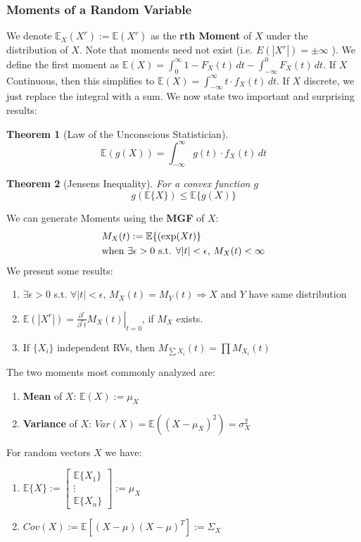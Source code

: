 \documentclass[]{article}
\theoremstyle{mattstyle}
\newtheorem{theorem}{Theorem}[section]
\theoremstyle{definition}
\begin{document}
\subsubsection{Moments of a Random Variable}
We denote \(\mathbb{E}_X(X^r) := \mathbb{E}(X^r)\) as the \textbf{rth Moment} of \(X\) under the distribution of \(X\). Note that moments need not exist (i.e. \(E(|X^r|)=\pm\infty\) ). We define the first moment as \(\mathbb{E}(X) = \int_0^\infty 1 - F_X(t)\,dt - \int_{-\infty}^0 F_X(t)\,dt\). If \(X\) Continuous, then this simplifies to \(\mathbb{E}(X) = \int_{-\infty}^{\infty} t \cdot f_X(t)\,dt\). If $X$ discrete, we just replace the integral with a sum. We now state two important and surprising results:
\begin{theorem}[Law of the Unconscious Statistician]
$$\mathbb{E}(g(X)) = \int_{-\infty}^{\infty} g(t) \cdot f_X(t)\,dt$$
\end{theorem}
\begin{theorem}[Jensens Inequality]
	For a convex function $g$ $$g(\mathbb{E}\{X\})\le\mathbb{E}\{g(X)\}$$
\end{theorem}
\newpage
We can generate Moments using the \textbf{MGF} of $X$:
\begin{align*}
&M_X(t) := \mathbb{E} \{(\exp(Xt)\} \\
&\text{when \( \exists \epsilon >0 \) s.t. \( \forall |t| < \epsilon\),  \(M_X(t) < \infty \)}
\end{align*}
We present some results:
\begin{enumerate}
	\item \( \exists \epsilon >0 \) s.t. \( \forall |t| < \epsilon\),  \(M_X(t) = M_Y(t) \Rightarrow X\) and \(Y\) have same distribution
	\item \(\mathbb{E}(|X^r|) = \left.\frac{\partial^r}{\partial^r t}M_X(t)\right\rvert_{t=0}\), if \(M_X\) exists.
	\item If \(\{ X_i\}\) independent RVs, then \( M_{\sum X_i} (t) = \prod M_{X_i}(t)\)
\end{enumerate}
The two moments most commonly analyzed are:
\begin{enumerate}
	\item \textbf{Mean} of \(X\): \(\mathbb{E}(X):=\mu_X\)
	\item \textbf{Variance} of \(X\): \(Var(X)=\mathbb{E}((X-\mu_{X})^2)=\sigma^2_{X}\)
\end{enumerate}
For random vectors \(X\) we have:
\begin{enumerate}
	\item \(\mathbb{E}\{X\} := \begin{bmatrix}
	\mathbb{E}\{X_1\} \\
	\vdots \\
	\mathbb{E}\{X_n\}
	\end{bmatrix} := \mu_X\)
	\item \(Cov(X) := \mathbb{E}[(X-\mu)(X-\mu)^T] := \Sigma_X\)
\end{enumerate}
\end{document}
